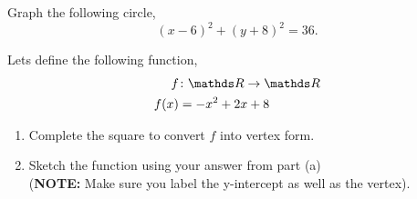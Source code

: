 \documentclass[12pt]{article} %
\begin{document}
\begin{qstn}[3]
  Graph the following circle,
  \[
          (x-6)^2 + (y + 8)^2 = 36
  .\] 
    \begin{center}
    \end{center}
\end{qstn}


\begin{qstn}[4]
  Lets define the following function,
  \begin{align*}
    f &\colon \R \to \R\\
    f(x) &= -x^2 + 2x + 8
  \end{align*}

 \begin{enumerate}[label=(\alph*)]
      \item Complete the square to convert $f$ into vertex form.
        \newpage
      \item Sketch the function using your answer from part (a) \\(\textbf{NOTE:} Make sure you label the y-intercept as well as the vertex).
 \end{enumerate}
    \begin{center}
    \end{center}
\end{qstn}
\end{document}
